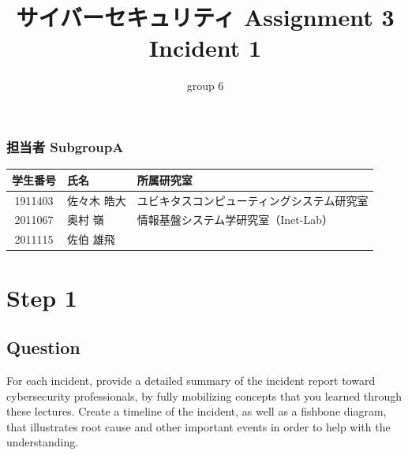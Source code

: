 \documentclass[uplatex]{jsarticle}
\title{
    \vspace{-1.5cm}
    サイバーセキュリティ Assignment 3 \\
    Incident 1
}
\author{group 6}
\begin{document}
\maketitle

\subsubsection*{担当者 SubgroupA}
\begin{table}[H]
    \begin{tabular}{|c|l|l|}
        \hline
        学生番号 & 氏名 & 所属研究室\\
        \hline\hline
        1911403 & 佐々木 皓大 & ユビキタスコンピューティングシステム研究室\\
        \hline
        2011067 & 奥村 嶺 & 情報基盤システム学研究室（Inet-Lab）\\
        \hline
        2011115 & 佐伯 雄飛 & \\
        \hline
    \end{tabular}
\end{table}

\section*{Step 1}
\subsection*{Question}
For each incident, provide a detailed summary of the incident report toward cybersecurity professionals, by fully mobilizing concepts that you learned through these lectures. Create a timeline of the incident, as well as a fishbone diagram, that illustrates root cause and other important events in order to help with the understanding.
\end{document}
